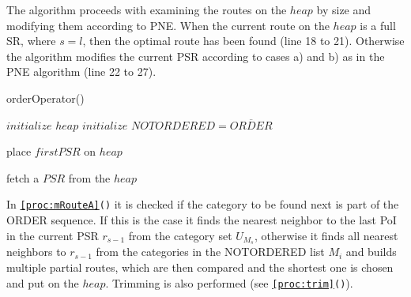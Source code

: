 The algorithm proceeds with examining the routes on the $heap$ by size and modifying them according to PNE. When the current route on the $heap$ is a full SR, where $s = l$, then the optimal route has been found (line 18 to 21). Otherwise the algorithm modifies the current PSR according to cases a) and b) as in the PNE algorithm (line 22 to 27). \newline

\begin{algorithm}[H]
\caption{orderOperator()}
\label{alg:order}
	
	
	\BlankLine
	
	$initialize$ $heap$\;
	$initialize$ $NOTORDERED = \overline{ORDER}$\;
	
	\BlankLine
	
	place $firstPSR$ on $heap$\;
	
	
	\BlankLine
	
	
	fetch a $PSR$ from the $heap$\;

\end{algorithm}

\pagebreak

In \texttt{\ref{proc:mRouteA}()} it is checked if the category to be found next is part of the ORDER sequence. If this is the case it finds the nearest neighbor to the last PoI in the current PSR $r_{s-1}$ from the category set $U_{M_{s}}$, otherwise it finds all nearest neighbors to $r_{s-1}$ from the categories in the NOTORDERED list $M_{i}$ and builds multiple partial routes, which are then compared and the shortest one is chosen and put on the $heap$.
Trimming is also performed (see \texttt{\ref{proc:trim}()}).

